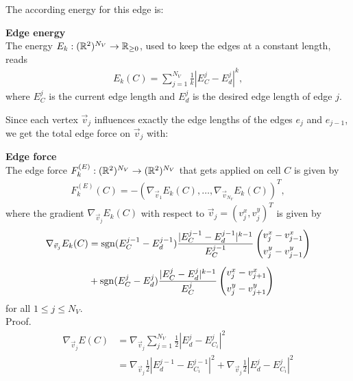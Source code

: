 The according energy for this edge is:
\begin{definition} \textbf{Edge energy} \\
	The energy $E_k: (\mathbb{R}^2)^{N_V} \rightarrow \mathbb{R}_{\geq 0}$, used to keep the edges at a constant length, reads 
	\begin{align}
		E_k(C) =  \sum\limits_{j=1}^{N_V} \frac{1}{k} |E^j_{C} - E^{j}_d|^k, \label{eq:edgeEnergy} 
	\end{align}
	where $E^j_{C}$ is the current edge length and $E^{j}_d$ is the desired edge length of edge $j$. 
\end{definition}

Since each vertex $\vec{v}_j$ influences exactly the edge lengths of the edges $e_{j}$ and $e_{j-1}$, we get the total edge force on $\vec{v}_j$ with: 

\begin{proposition} \textbf{Edge force} \\

	The edge force $F_{k}^{(E)}: (\mathbb{R}^2)^{N_V} \rightarrow (\mathbb{R}^2)^{N_V}$ that gets applied on cell $C$ is given by  
	\begin{align*}
		F_{k}^{(E)}(C) 
		= - (\nabla_{\vec{v}_1} E_k(C), \ldots, \nabla_{\vec{v}_{N_V}} E_k(C))^T,
	\end{align*}
	where the gradient $\nabla_{\vec{v}_j} E_k(C)$ with respect to $\vec{v}_j = (v_{j}^{x}, v_{j}^{y})^T$ is given by 
	\begin{align}
		\begin{split}
			\nabla_{\vec{v}_j} E_k(C) &= \operatorname{sgn}(E^{j-1}_{C}- E_d^{j-1}) \dfrac{|E^{j-1}_{C}- E_d^{j-1}|^{k-1}}{E^{j-1}_{C}}  
			\begin{pmatrix} v_{j}^{x} - v_{j-1}^{x} \\[0.5em]  v_{j}^{y} - v_{j-1}^{y}  \end{pmatrix} \\[0.5em]
			&+ \operatorname{sgn}(E^j_{C} - E_d^{j}) \dfrac{|E^j_{C} - E_d^{j}|^{k-1}}{E^j_{C}}  
			\begin{pmatrix} v_{j}^{x} - v_{j+1}^{x} \\[0.5em]  v_{j}^{y} - v_{j+1}^{y} \end{pmatrix}
		\end{split}
		\label{gradient:edge}
	\end{align}
	for all $1 \leq j \leq N_V$.\\

	Proof. \\

	\begin{align*}
		\nabla_{\vec{v}_{j}} E(C) &= \nabla_{\vec{v}_{j}} \sum\limits_{j=1}^{N_V} \frac{1}{2} | E^{j}_d - E^j_{C_i}|^2 \\
		&= \nabla_{\vec{v}_{j}} \frac{1}{2} | E^{j-1}_d - E^{j-1}_{C_i}|^2 + \nabla_{\vec{v}_{j}} \frac{1}{2} | E^{j}_d - E^j_{C_i}|^2 
	\end{align*}


\end{proposition}
